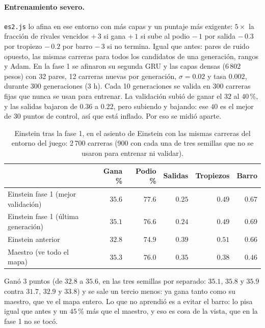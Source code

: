 \documentclass[11pt,letterpaper]{article}
\begin{document}
\paragraph{Entrenamiento severo.} \texttt{es2.js} lo afina en ese entorno con más capas y un puntaje más exigente: $5 \times$ la fracción de rivales vencidos $+\,3$ si gana $+\,1$ si sube al podio $-\,1$ por salida $-\,0.3$ por tropiezo $-\,0.2$ por barro $-\,3$ si no termina. Igual que antes: pares de ruido opuesto, las mismas carreras para todos los candidatos de una generación, rangos y Adam. En la fase 1 se afinaron su segunda GRU y las capas densas (6\,802 pesos) con 32 pares, 12 carreras nuevas por generación, $\sigma = 0.02$ y tasa $0.002$, durante 300 generaciones (3 h). Cada 10 generaciones se valida en 300 carreras fijas que nunca se usan para entrenar. La validación subió de ganar el $32$ al $40$\,\%, y las salidas bajaron de $0.36$ a $0.22$, pero subiendo y bajando: ese $40$ es el mejor de 30 puntos de control, así que está inflado. Por eso se midió aparte.

\begin{table}[h]
\centering
\caption{Einstein tras la fase 1, en el asiento de Einstein con las mismas carreras del entorno del juego: 2\,700 carreras (900 con cada una de tres semillas que no se usaron para entrenar ni validar).}\label{tab:einstein-f1}
\begin{tabular}{lrrrrr}
\toprule
 & Gana \% & Podio \% & Salidas & Tropiezos & Barro \\
\midrule
Einstein fase 1 (mejor validación) & $35.6$ & $77.6$ & $0.25$ & $0.49$ & $0.67$ \\
Einstein fase 1 (última generación) & $35.1$ & $76.6$ & $0.24$ & $0.49$ & $0.69$ \\
Einstein anterior & $32.8$ & $74.9$ & $0.39$ & $0.51$ & $0.66$ \\
Maestro (ve todo el mapa) & $35.3$ & $76.0$ & $0.35$ & $0.38$ & $0.46$ \\
\bottomrule
\end{tabular}
\end{table}

Ganó 3 puntos (de $32.8$ a $35.6$, en las tres semillas por separado: $35.1$, $35.8$ y $35.9$ contra $31.7$, $32.9$ y $33.8$) y se sale un tercio menos: ya gana tanto como su maestro, que ve el mapa entero. Lo que no aprendió es a evitar el barro: lo pisa igual que antes y un $45$\,\% más que el maestro, y eso es cosa de la vista, que en la fase 1 no se tocó.
\end{document}
